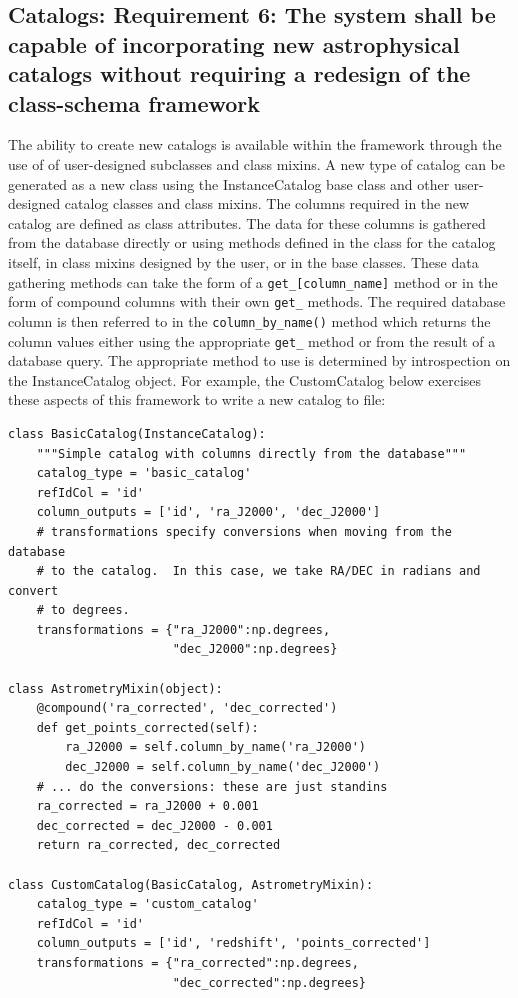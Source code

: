 \documentclass[]{article}
\begin{document}
{\subsection{Catalogs: Requirement 6: The system shall be capable of incorporating new astrophysical catalogs without requiring
a redesign of the class-schema framework}
The ability to create new catalogs is available within the framework through the use of of user-designed subclasses and class mixins. A new type of catalog can be generated as a new class using the InstanceCatalog base class and other user-designed catalog classes and class mixins. The columns required in the new catalog are defined as class attributes. The data for these columns is gathered from the database directly or using methods defined in the class
for the catalog itself, in class mixins designed by the user, or in the base classes. These data gathering methods can take the form of a {\tt get\_[column\_name]} method or in the form of compound columns with their own {\tt get\_} methods. The required database column is then referred to in the {\tt column\_by\_name()} method which returns the column values either using the appropriate {\tt get\_} method or from the result of a database query. The appropriate method to use is determined by
introspection on the InstanceCatalog object. For example, the CustomCatalog below exercises these aspects of this framework to write a new catalog to file:

\begin{verbatim}
class BasicCatalog(InstanceCatalog):
    """Simple catalog with columns directly from the database"""
    catalog_type = 'basic_catalog'
    refIdCol = 'id'
    column_outputs = ['id', 'ra_J2000', 'dec_J2000']
    # transformations specify conversions when moving from the database
    # to the catalog.  In this case, we take RA/DEC in radians and convert
    # to degrees.
    transformations = {"ra_J2000":np.degrees,
                       "dec_J2000":np.degrees}

class AstrometryMixin(object):
    @compound('ra_corrected', 'dec_corrected')
    def get_points_corrected(self):
        ra_J2000 = self.column_by_name('ra_J2000')
        dec_J2000 = self.column_by_name('dec_J2000')
    # ... do the conversions: these are just standins
    ra_corrected = ra_J2000 + 0.001
    dec_corrected = dec_J2000 - 0.001
    return ra_corrected, dec_corrected

class CustomCatalog(BasicCatalog, AstrometryMixin):
    catalog_type = 'custom_catalog'
    refIdCol = 'id'
    column_outputs = ['id', 'redshift', 'points_corrected']
    transformations = {"ra_corrected":np.degrees,
                       "dec_corrected":np.degrees}


\end{verbatim}}
\end{document}
